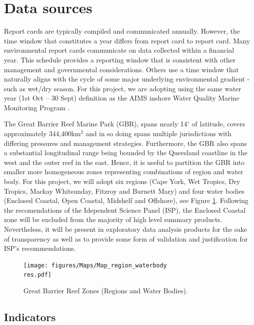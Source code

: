 \section{Data sources}\label{sec:sources}

Report cards are typically compiled and communicated annually.  However, the time window that
constitutes a year differs from report card to report card.  Many environmental report cards
communicate on data collected within a financial year.  This schedule provides a reporting window
that is consistent with other management and governmental considerations.  Others use a time window
that naturally aligns with the cycle of some major underlying environmental gradient - such as
wet/dry season. For this project, we are adopting using the same water year (1st Oct -- 30 Sept)
definition as the AIMS inshore Water Quality Marine Monitoring Program \citep{Lonborg-MMP-2015}.

The Great Barrier Reef Marine Park (GBR), spans nearly 14$^\circ$ of latitude, covers approximately
344,400km$^2$ and in so doing spans multiple jurisdictions with differing pressures and management strategies.
Furthermore, the GBR also spans a substantial longitudinal range being bounded by the Queesland coastline in the west and the outer reef in the east.
Hence, it is useful to partition
the GBR into smaller more homogeneous zones representing combinations of region and water body.
For this project, we will adopt
six regions (Cape York, Wet Tropics, Dry Tropics, Mackay Whitsunday, Fitzroy and Burnett Mary) and
four water bodies (Enclosed Coastal, Open Coastal, Midshelf and Offshore), see Figure \ref{fig:Map_region_waterbody}.
Following the recomendations of the Idependent Science Panel (ISP), the Enclosed Coastal zone will be
excluded from the majority of high level summary products.  Nevertheless, it will be present in exploratory
data analysis products for the sake of transparency as well as to provide some form of validation and
justification for ISP's recommendations.
 

  
\begin{figure}[ptbh] \texttt{[image: figures/Maps/Map\_region\_waterbody\\res.pdf]}
\caption{Great Barrier Reef Zones (Regions and Water Bodies).}\label{fig:Map_region_waterbody}
\end{figure}
   



\subsection{Indicators}

